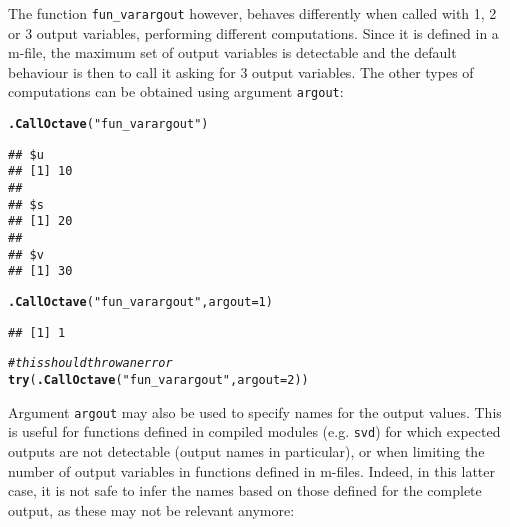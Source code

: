 \documentclass[english,10pt,a4paper]{article}\usepackage[]{graphicx}\usepackage[]{color}
\makeatletter
\newcommand{\hlnum}[1]{\textcolor[rgb]{0.686,0.059,0.569}{#1}}%
\newcommand{\hlstr}[1]{\textcolor[rgb]{0.192,0.494,0.8}{#1}}%
\newcommand{\hlcom}[1]{\textcolor[rgb]{0.678,0.584,0.686}{\textit{#1}}}%
\newcommand{\hlstd}[1]{\textcolor[rgb]{0.345,0.345,0.345}{#1}}%
\newcommand{\hlkwc}[1]{\textcolor[rgb]{0.333,0.667,0.333}{#1}}%
\newcommand{\hlkwd}[1]{\textcolor[rgb]{0.737,0.353,0.396}{\textbf{#1}}}%
\newenvironment{kframe}{%
 \def\at@end@of@kframe{}%
 \ifinner\ifhmode%
  \def\at@end@of@kframe{\end{minipage}}%
  \begin{minipage}{\columnwidth}%
 \fi\fi%
 \def\FrameCommand##1{\hskip\@totalleftmargin \hskip-\fboxsep
 \colorbox{shadecolor}{##1}\hskip-\fboxsep
     \hskip-\linewidth \hskip-\@totalleftmargin \hskip\columnwidth}%
 \MakeFramed {\advance\hsize-\width
   \@totalleftmargin\z@ \linewidth\hsize
   \@setminipage}}%
 {\par\unskip\endMakeFramed%
 \at@end@of@kframe}
\newenvironment{knitrout}{}{} %
\let\code=\texttt
\makeatother
\begin{document}
The function \code{fun\_varargout} however, behaves differently when called
with 1, 2 or 3 output variables, performing different computations.
Since it is defined in a m-file, the maximum set of output variables is
detectable and the default behaviour is then to call it asking for 3 output
variables.
The other types of computations can be obtained using argument \code{argout}:

\begin{knitrout}
\color{fgcolor}\begin{kframe}
\begin{alltt}
\hlkwd{.CallOctave}\hlstd{(}\hlstr{"fun_varargout"}\hlstd{)}
\end{alltt}
\begin{verbatim}
## $u
## [1] 10
## 
## $s
## [1] 20
## 
## $v
## [1] 30
\end{verbatim}
\begin{alltt}
\hlkwd{.CallOctave}\hlstd{(}\hlstr{"fun_varargout"}\hlstd{,} \hlkwc{argout} \hlstd{=} \hlnum{1}\hlstd{)}
\end{alltt}
\begin{verbatim}
## [1] 1
\end{verbatim}
\begin{alltt}
\hlcom{# this should throw an error}
\hlkwd{try}\hlstd{(}\hlkwd{.CallOctave}\hlstd{(}\hlstr{"fun_varargout"}\hlstd{,} \hlkwc{argout} \hlstd{=} \hlnum{2}\hlstd{))}
\end{alltt}


{\ttfamily\noindent\bfseries\color{errorcolor}{\#\# Error: RcppOctave - error in Octave function `fun\_varargout`:\\\#\#\ \  usage: Expecting 1 or 3 output variables.\\\#\# error:\ \  fun\_varargout at line 34, column 7}}\end{kframe}
\end{knitrout}


Argument \code{argout} may also be used to specify names for the output values.
This is useful for functions defined in compiled modules (e.g. \code{svd}) for
which expected outputs are not detectable (output names in particular), or when
limiting the number of output variables in functions defined in m-files.
Indeed, in this latter case, it is not safe to infer the names based on those
defined for the complete output, as these may not be relevant anymore:
\end{document}
